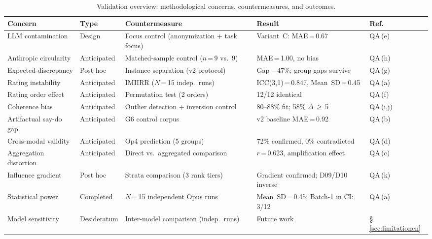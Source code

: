 \documentclass[12pt,a4paper]{article}
\begin{document}
\begin{table}[htbp]
  \centering
  \caption{Validation overview: methodological concerns, countermeasures, and outcomes.}
  \label{tab:validation_overview}
  \scriptsize
  \begin{tabular}{@{} p{2.4cm} p{1.4cm} p{4.2cm} p{4.5cm} p{1.0cm} @{}}
    \toprule
    \textbf{Concern} & \textbf{Type} & \textbf{Countermeasure} & \textbf{Result} & \textbf{Ref.} \\
    \midrule
    LLM contamination & Design & Focus control (anonymization + task focus) & Variant~C: MAE\,=\,0.67 & QA\,(e) \\[3pt]
    Anthropic circularity & Anticipated & Matched-sample control ($n$\,=\,9 vs.\ 9) & MAE\,=\,1.00, no bias & QA\,(h) \\[3pt]
    Expected-discrepancy & Post hoc & Instance separation (v2 protocol) & Gap $-47\%$; group gaps survive & QA\,(g) \\[3pt]
    Rating instability & Anticipated & IMIIRR ($N$\,=\,15 indep.\ runs) & ICC(3,1)\,=\,0.847, Mean~SD\,=\,0.45 & QA\,(a) \\[3pt]
    Rating order effect & Anticipated & Permutation test (2 orders) & 12/12 identical & QA\,(f) \\[3pt]
    Coherence bias & Anticipated & Outlier detection + inversion control & 80--88\% fit; 58\% $\Delta$\,$\geq$\,5 & QA\,(i,j) \\[3pt]
    Artifactual say-do gap & Anticipated & G6 control corpus & v2 baseline MAE\,=\,0.92 & QA\,(b) \\[3pt]
    Cross-modal validity & Anticipated & Op4 prediction (5 groups) & 72\% confirmed, 0\% contradicted & QA\,(d) \\[3pt]
    Aggregation distortion & Anticipated & Direct vs.\ aggregated comparison & $r$\,=\,0.623, amplification effect & QA\,(c) \\[3pt]
    Influence gradient & Post hoc & Strata comparison (3 rank tiers) & Gradient confirmed; D09/D10 inverse & QA\,(k) \\[3pt]
    Statistical power & Completed & $N$\,=\,15 independent Opus runs & Mean~SD\,=\,0.45; Batch-1 in CI: 3/12 & QA\,(a) \\[3pt]
    Model sensitivity & Desideratum & Inter-model comparison (indep.\ runs) & Future work & \S\,\ref{sec:limitationen} \\
    \bottomrule
  \end{tabular}
\end{table}
\end{document}
